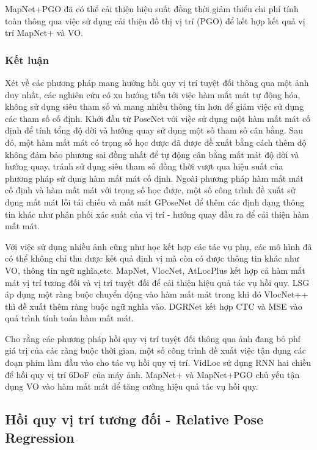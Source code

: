 MapNet+PGO đã có thể cải thiện hiệu suất đồng thời giảm thiểu chi phí tính toàn thông qua việc sử dụng cải thiện đồ thị vị trí (PGO) để kết hợp kết quả vị trí MapNet+ và VO.

\subsubsection*{Kết luận}
Xét về các phương pháp mang hướng hồi quy vị trí tuyệt đối thông qua một ảnh duy nhất, các nghiên cứu có xu hướng tiến tới việc hàm mất mát tự động hóa, không sử dụng siêu tham số và mang nhiều thông tin hơn để giảm việc sử dụng các tham số cố định. Khởi đầu từ PoseNet với việc sử dụng một hàm mất mát cố định để tính tổng độ dời và hướng quay sử dụng một số tham số cân bằng. Sau đó, một hàm mất mát có trọng số học được \cite{wang2019atloc, bui2019adversarial} đã được đề xuất bằng cách thêm độ không đảm bảo phương sai đồng nhất để tự động cân bằng mất mát độ dời và hướng quay, tránh sử dụng siêu tham số đồng thời vượt qua hiệu suất của phương pháp sử dụng hàm mất mát cố định. Ngoài phương pháp hàm mất mát cố định và hàm mất mát với trọng số học được, một số công trình \cite{kendall2017geometric, Cai2018AHP} đề xuất sử dụng mất mát lỗi tái chiếu và mất mát GPoseNet để thêm các định dạng thông tin khác như phân phối xác suất của vị trí - hướng quay đầu ra để cải thiện hàm mất mát.

Với việc sử dụng nhiều ảnh cũng như học kết hợp các tác vụ phụ, các mô hình đã có thể không chỉ thu được kết quả định vị mà còn có được thông tin khác như VO, thông tin ngữ nghĩa,etc. MapNet, VlocNet, AtLocPlus \cite{wang2019atloc} kết hợp cả hàm mất mát vị trí tương đối và vị trí tuyệt đối để cải thiện hiệu quả tác vụ hồi quy. LSG \cite{xue2019local} áp dụng một ràng buộc chuyển động vào hàm mất mát trong khi đó VlocNet++ \cite{Radwan_2018} thì đề xuất thêm ràng buộc ngữ nghĩa vào. DGRNet \cite{lin2019deep} kết hợp CTC và MSE vào quá trình tính toán hàm mất mát.

Cho rằng các phương pháp hồi quy vị trí tuyệt đối thông qua ảnh đang bỏ phí giá trị của các ràng buộc thời gian, một số công trình \cite{clark2017vidloc, brahmbhatt2018geometryaware} đề xuất việc tận dụng các đoạn phim làm đầu vào cho tác vụ hồi quy vị trí. VidLoc \cite{clark2017vidloc} sử dụng RNN hai chiều để hồi quy vị trí 6DoF của máy ảnh. MapNet+ và MapNet+PGO \cite{brahmbhatt2018geometryaware} chủ yếu tận dụng VO vào hàm mất mát để tăng cường hiệu quả tác vụ hồi quy.

\subsection{Hồi quy vị trí tương đối - Relative Pose Regression}

